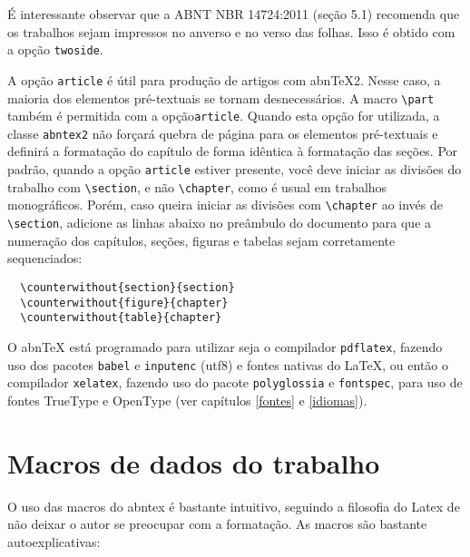 É interessante observar que a ABNT NBR 14724:2011 (seção 5.1) recomenda que os
trabalhos sejam impressos no anverso e no verso das folhas. Isso é obtido com a
opção \texttt{twoside}. 

A opção \verb+article+ é útil para produção de artigos com abn\TeX 2.
Nesse caso, a maioria dos elementos pré-textuais se tornam desnecessários. A macro \verb+\part+ também é permitida com a opção\texttt{article}. Quando esta opção for
utilizada, a classe \texttt{abntex2} não forçará quebra de página para os
elementos pré-textuais e definirá a formatação do capítulo de forma idêntica à
formatação das seções. Por padrão, quando a opção \texttt{article} estiver presente,
você deve iniciar as divisões do trabalho com \verb+\section+, e não \verb+\chapter+, como
é usual em trabalhos monográficos. Porém, caso queira iniciar as divisões com
\verb+\chapter+ ao invés de \verb+\section+, adicione as linhas abaixo no preâmbulo do
documento para que a numeração dos capítulos, seções, figuras e tabelas sejam
corretamente sequenciados:

\begin{verbatim}
  \counterwithout{section}{section}
  \counterwithout{figure}{chapter}
  \counterwithout{table}{chapter}
\end{verbatim}

O abn\TeX{} está programado para utilizar seja o compilador \texttt{pdflatex}, fazendo uso dos pacotes \texttt{babel} e \texttt{inputenc} (utf8) e fontes nativas do \LaTeX, ou então o compilador \texttt{xelatex}, fazendo uso do pacote \texttt{polyglossia} e \texttt{fontspec}, para uso de fontes TrueType e OpenType (ver capítulos \ref{fontes} e \ref{idiomas}).

\section{Macros de dados do trabalho}\label{sec-macrosdados}
O uso das macros do abntex é bastante intuitivo, seguindo a filosofia do Latex de não deixar o autor se preocupar com a formatação. As macros são bastante autoexplicativas:

